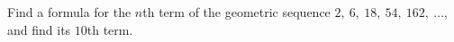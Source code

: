 Find a formula for the $n$th term of the geometric sequence $2,\ 6,\ 18,\ 54,\ 162,\ \dots$, and find its $10$th term.
